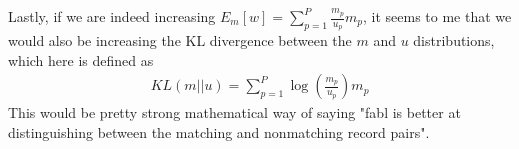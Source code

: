 \documentclass[12pt,letterpaper]{article}
\newcommand{\1}[1]{\mathbb{I}\!\left[#1\right]} %
\begin{document}
Lastly, if we are indeed increasing $E_m[w] = \sum_{p=1}^P \frac{m_p}{u_p}m_p$, it seems to me that we would also be increasing the KL divergence between the $m$ and $u$ distributions, which here is defined as
\begin{align*}
	KL(m||u) = \sum_{p=1}^P \log \left(\frac{m_p}{u_p}\right)m_p
\end{align*}
This would be pretty strong mathematical way of saying "fabl is better at distinguishing between the matching and nonmatching record pairs".

%
%
%
\end{document}
